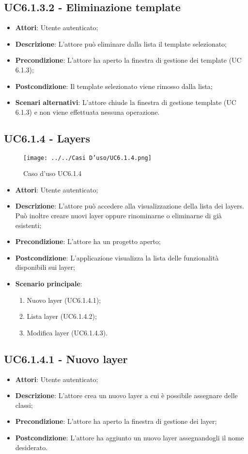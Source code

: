\subsection{UC6.1.3.2 - Eliminazione template} 
\label{ssec:UC6.1.3.2} 
\begin{itemize} 
\item \textbf{Attori}: Utente autenticato;
\item \textbf{Descrizione}: L'attore può eliminare dalla lista il template selezionato;
\item \textbf{Precondizione}: L'attore ha aperto la finestra di gestione dei template (UC 6.1.3);
\item \textbf{Postcondizione}: Il template selezionato viene rimosso dalla lista;
\item \textbf{Scenari alternativi}: L'attore chiude la finestra di gestione template (UC 6.1.3) e non viene effettuata nessuna operazione.
\end{itemize} 
\newpage
\subsection{UC6.1.4 - Layers} 
\label{ssec:UC6.1.4} 
\begin{figure}[h!] 
\centering 
\texttt{[image: ../../Casi D'uso/UC6.1.4.png]} 
\caption{Caso d'uso UC6.1.4} 
 \end{figure} 
\begin{itemize} 
\item \textbf{Attori}: Utente autenticato;
\item \textbf{Descrizione}: L’attore  può accedere alla visualizzazione della lista dei layers. Può inoltre creare nuovi layer oppure rinominarne o eliminarne di già esistenti;
\item \textbf{Precondizione}: L’attore ha un progetto aperto;
\item \textbf{Postcondizione}: L'applicazione visualizza la lista delle funzionalità disponibili sui layer;
\item \textbf{Scenario principale}: \begin{enumerate}\item Nuovo layer (UC6.1.4.1);\item Lista layer (UC6.1.4.2);\item Modifica layer (UC6.1.4.3). 
 \end{enumerate}
\end{itemize} 
\subsection{UC6.1.4.1 - Nuovo layer} 
\label{ssec:UC6.1.4.1} 
\begin{itemize} 
\item \textbf{Attori}: Utente autenticato;
\item \textbf{Descrizione}: L'attore crea un nuovo layer a cui è possibile assegnare delle classi;
\item \textbf{Precondizione}: L'attore ha aperto la finestra di gestione dei layer;
\item \textbf{Postcondizione}: L'attore ha aggiunto un nuovo layer assegnandogli il nome desiderato.
\end{itemize} 
